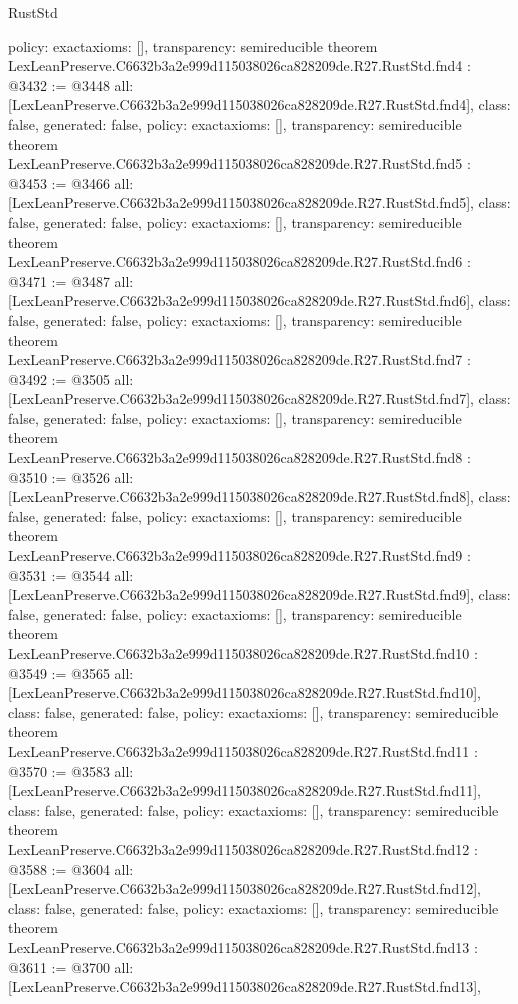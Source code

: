 \begin{lexlean}{RustStd}
\begin{coremodule}
{  policy: exact{axioms: []},
  transparency: semireducible
}
theorem LexLeanPreserve.C6632b3a2e999d115038026ca828209de.R27.RustStd.fnd4 : @3432 := @3448 {
  all: [LexLeanPreserve.C6632b3a2e999d115038026ca828209de.R27.RustStd.fnd4],
  class: false,
  generated: false,
  policy: exact{axioms: []},
  transparency: semireducible
}
theorem LexLeanPreserve.C6632b3a2e999d115038026ca828209de.R27.RustStd.fnd5 : @3453 := @3466 {
  all: [LexLeanPreserve.C6632b3a2e999d115038026ca828209de.R27.RustStd.fnd5],
  class: false,
  generated: false,
  policy: exact{axioms: []},
  transparency: semireducible
}
theorem LexLeanPreserve.C6632b3a2e999d115038026ca828209de.R27.RustStd.fnd6 : @3471 := @3487 {
  all: [LexLeanPreserve.C6632b3a2e999d115038026ca828209de.R27.RustStd.fnd6],
  class: false,
  generated: false,
  policy: exact{axioms: []},
  transparency: semireducible
}
theorem LexLeanPreserve.C6632b3a2e999d115038026ca828209de.R27.RustStd.fnd7 : @3492 := @3505 {
  all: [LexLeanPreserve.C6632b3a2e999d115038026ca828209de.R27.RustStd.fnd7],
  class: false,
  generated: false,
  policy: exact{axioms: []},
  transparency: semireducible
}
theorem LexLeanPreserve.C6632b3a2e999d115038026ca828209de.R27.RustStd.fnd8 : @3510 := @3526 {
  all: [LexLeanPreserve.C6632b3a2e999d115038026ca828209de.R27.RustStd.fnd8],
  class: false,
  generated: false,
  policy: exact{axioms: []},
  transparency: semireducible
}
theorem LexLeanPreserve.C6632b3a2e999d115038026ca828209de.R27.RustStd.fnd9 : @3531 := @3544 {
  all: [LexLeanPreserve.C6632b3a2e999d115038026ca828209de.R27.RustStd.fnd9],
  class: false,
  generated: false,
  policy: exact{axioms: []},
  transparency: semireducible
}
theorem LexLeanPreserve.C6632b3a2e999d115038026ca828209de.R27.RustStd.fnd10 : @3549 := @3565 {
  all: [LexLeanPreserve.C6632b3a2e999d115038026ca828209de.R27.RustStd.fnd10],
  class: false,
  generated: false,
  policy: exact{axioms: []},
  transparency: semireducible
}
theorem LexLeanPreserve.C6632b3a2e999d115038026ca828209de.R27.RustStd.fnd11 : @3570 := @3583 {
  all: [LexLeanPreserve.C6632b3a2e999d115038026ca828209de.R27.RustStd.fnd11],
  class: false,
  generated: false,
  policy: exact{axioms: []},
  transparency: semireducible
}
theorem LexLeanPreserve.C6632b3a2e999d115038026ca828209de.R27.RustStd.fnd12 : @3588 := @3604 {
  all: [LexLeanPreserve.C6632b3a2e999d115038026ca828209de.R27.RustStd.fnd12],
  class: false,
  generated: false,
  policy: exact{axioms: []},
  transparency: semireducible
}
theorem LexLeanPreserve.C6632b3a2e999d115038026ca828209de.R27.RustStd.fnd13 : @3611 := @3700 {
  all: [LexLeanPreserve.C6632b3a2e999d115038026ca828209de.R27.RustStd.fnd13],
}
\end{coremodule}
\end{lexlean}
